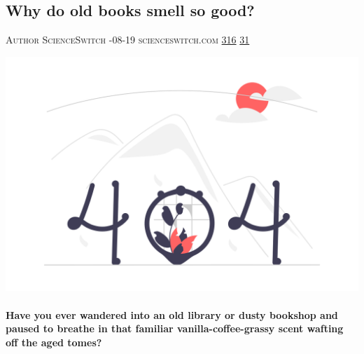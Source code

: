 \documentclass[10pt,a4paper]{article}
\begin{document}
\begin{multicols*}{2}

\noindent\begin{minipage}{\linewidth}
\subsection{Why do old books smell so good?}
\textsc{\footnotesize
{\scriptsize\faUser}\space 
Author ScienceSwitch 
{\scriptsize\faCalendar}-08-19 
{\scriptsize\faGlobe}\space 
scienceswitch.com 
{\scriptsize\faThumbsOUp}\space 
\href{http://news.ycombinator.com/item?id=37188015\&utm\_term=comment}{316} 
{\scriptsize\faComments}\space 
\href{http://news.ycombinator.com/item?id=37188015\&utm\_term=comment}{31} 
}
\par\medskip\noindent
\href{https://scienceswitch.com/2023/08/19/why-do-old-books-smell-so-good/?utm\_source=hackernewsletter\&utm\_medium=email\&utm\_term=books}{
    \includegraphics[width=0.99\linewidth]{notfound.png}
}
\end{minipage}
\paragraph{}
\textbf{Have you ever wandered into an old library or dusty bookshop and paused to breathe in that familiar vanilla-coffee-grassy scent wafting off the aged tomes?}

\end{multicols*}
\end{document}
